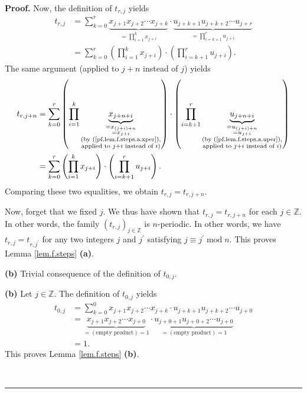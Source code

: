 \documentclass[numbers=enddot,12pt,final,onecolumn,notitlepage]{scrartcl}%
\theoremstyle{definition}
\newenvironment{proof}[1][Proof]{\noindent\textbf{#1.} }{\ \rule{0.5em}{0.5em}}
\let\sumnonlimits\sum
\let\prodnonlimits\prod
\renewcommand{\sum}{\sumnonlimits\limits}
\renewcommand{\prod}{\prodnonlimits\limits}
\newenvironment{verlong}{}{}
\newenvironment{vershort}{}{}
\begin{document}
\begin{proof}
\begin{verlong}
Now, the definition of $t_{r,j}$ yields%
\begin{align*}
t_{r,j}  &  =\sum_{k=0}^{r}\underbrace{x_{j+1}x_{j+2}\cdots x_{j+k}}%
_{=\prod_{i=1}^{k}x_{j+i}}\cdot\underbrace{u_{j+k+1}u_{j+k+2}\cdots u_{j+r}%
}_{=\prod_{i=k+1}^{r}u_{j+i}}\\
&  =\sum_{k=0}^{r}\left(  \prod_{i=1}^{k}x_{j+i}\right)  \cdot\left(
\prod_{i=k+1}^{r}u_{j+i}\right)  .
\end{align*}
The same argument (applied to $j+n$ instead of $j$) yields%
\begin{align*}
t_{r,j+n}  &  =\sum_{k=0}^{r}\left(  \prod_{i=1}^{k}\underbrace{x_{j+n+i}%
}_{\substack{=x_{\left(  j+i\right)  +n}\\=x_{j+i}\\\text{(by
(\ref{pf.lem.f.steps.a.xper}),}\\\text{applied to }j+i\text{ instead of
}i\text{)}}}\right)  \cdot\left(  \prod_{i=k+1}^{r}\underbrace{u_{j+n+i}%
}_{\substack{=u_{\left(  j+i\right)  +n}\\=u_{j+i}\\\text{(by
(\ref{pf.lem.f.steps.a.uper}),}\\\text{applied to }j+i\text{ instead of
}i\text{)}}}\right) \\
&  =\sum_{k=0}^{r}\left(  \prod_{i=1}^{k}x_{j+i}\right)  \cdot\left(
\prod_{i=k+1}^{r}u_{j+i}\right)  .
\end{align*}
Comparing these two equalities, we obtain $t_{r,j}=t_{r,j+n}$.

Now, forget that we fixed $j$. We thus have shown that $t_{r,j}=t_{r,j+n}$ for
each $j\in\mathbb{Z}$. In other words, the family $\left(  t_{r,j}\right)
_{j\in\mathbb{Z}}$ is $n$-periodic. In other words, we have $t_{r,j}%
=t_{r,j^{\prime}}$ for any two integers $j$ and $j^{\prime}$ satisfying
$j\equiv j^{\prime}\operatorname{mod}n$. This proves Lemma \ref{lem.f.steps}
\textbf{(a)}.
\end{verlong}

\begin{vershort}
\textbf{(b)} Trivial consequence of the definition of $t_{0,j}$.
\end{vershort}

\begin{verlong}
\textbf{(b)} Let $j\in\mathbb{Z}$. The definition of $t_{0,j}$ yields%
\begin{align*}
t_{0,j}  &  =\sum_{k=0}^{0}x_{j+1}x_{j+2}\cdots x_{j+k}\cdot u_{j+k+1}%
u_{j+k+2}\cdots u_{j+0}\\
&  =\underbrace{x_{j+1}x_{j+2}\cdots x_{j+0}}_{=\left(  \text{empty
product}\right)  =1}\cdot\underbrace{u_{j+0+1}u_{j+0+2}\cdots u_{j+0}%
}_{=\left(  \text{empty product}\right)  =1}\\
&  =1.
\end{align*}
This proves Lemma \ref{lem.f.steps} \textbf{(b)}.
\end{verlong}


\end{proof}
\end{document}
